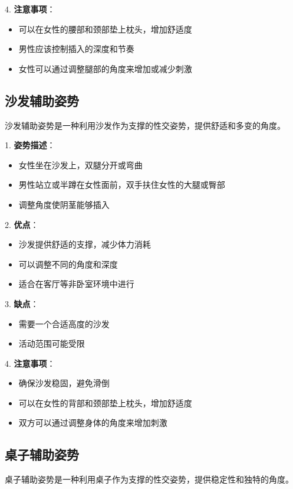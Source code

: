 \documentclass[12pt,UTF8]{ctexbook}
\begin{document}
4. \textbf{注意事项}：
  \begin{itemize}
  \item 可以在女性的腰部和颈部垫上枕头，增加舒适度
  \item 男性应该控制插入的深度和节奏
  \item 女性可以通过调整腿部的角度来增加或减少刺激
  \end{itemize}

\subsection{沙发辅助姿势}

沙发辅助姿势是一种利用沙发作为支撑的性交姿势，提供舒适和多变的角度。

1. \textbf{姿势描述}：
  \begin{itemize}
  \item 女性坐在沙发上，双腿分开或弯曲
  \item 男性站立或半蹲在女性面前，双手扶住女性的大腿或臀部
  \item 调整角度使阴茎能够插入
  \end{itemize}

2. \textbf{优点}：
  \begin{itemize}
  \item 沙发提供舒适的支撑，减少体力消耗
  \item 可以调整不同的角度和深度
  \item 适合在客厅等非卧室环境中进行
  \end{itemize}

3. \textbf{缺点}：
  \begin{itemize}
  \item 需要一个合适高度的沙发
  \item 活动范围可能受限
  \end{itemize}

4. \textbf{注意事项}：
  \begin{itemize}
  \item 确保沙发稳固，避免滑倒
  \item 可以在女性的背部和颈部垫上枕头，增加舒适度
  \item 双方可以通过调整身体的角度来增加刺激
  \end{itemize}

\subsection{桌子辅助姿势}

桌子辅助姿势是一种利用桌子作为支撑的性交姿势，提供稳定性和独特的角度。
\end{document}
